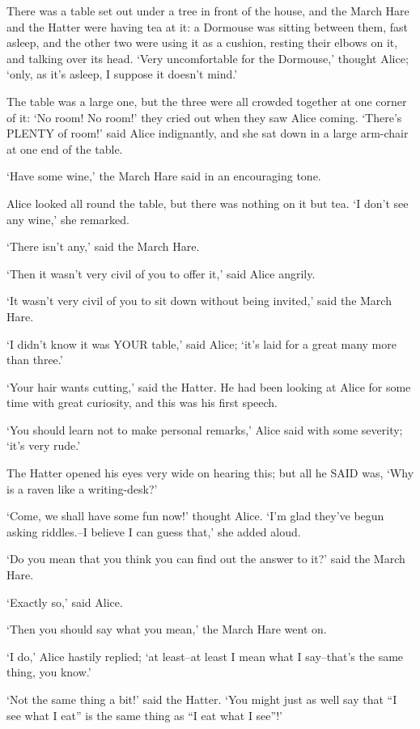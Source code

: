 \documentclass[12pt]{book}
\begin{document}
  There was a table set out under a tree in front of the house,
and the March Hare and the Hatter were having tea at it:  a
Dormouse was sitting between them, fast asleep, and the other two
were using it as a cushion, resting their elbows on it, and talking
over its head.  `Very uncomfortable for the Dormouse,' thought Alice;
`only, as it's asleep, I suppose it doesn't mind.'

  The table was a large one, but the three were all crowded
together at one corner of it:  `No room!  No room!' they cried
out when they saw Alice coming.  `There's PLENTY of room!' said
Alice indignantly, and she sat down in a large arm-chair at one
end of the table.

  `Have some wine,' the March Hare said in an encouraging tone.

  Alice looked all round the table, but there was nothing on it
but tea.  `I don't see any wine,' she remarked.

  `There isn't any,' said the March Hare.

  `Then it wasn't very civil of you to offer it,' said Alice
angrily.

  `It wasn't very civil of you to sit down without being
invited,' said the March Hare.

  `I didn't know it was YOUR table,' said Alice; `it's laid for a
great many more than three.'

  `Your hair wants cutting,' said the Hatter.  He had been
looking at Alice for some time with great curiosity, and this was
his first speech.

  `You should learn not to make personal remarks,' Alice said
with some severity; `it's very rude.'

  The Hatter opened his eyes very wide on hearing this; but all
he SAID was, `Why is a raven like a writing-desk?'

  `Come, we shall have some fun now!' thought Alice.  `I'm glad
they've begun asking riddles.--I believe I can guess that,' she
added aloud.

  `Do you mean that you think you can find out the answer to it?'
said the March Hare.

  `Exactly so,' said Alice.

  `Then you should say what you mean,' the March Hare went on.

  `I do,' Alice hastily replied; `at least--at least I mean what
I say--that's the same thing, you know.'

  `Not the same thing a bit!' said the Hatter.  `You might just
as well say that ``I see what I eat'' is the same thing as ``I eat
what I see''!'
\end{document}
